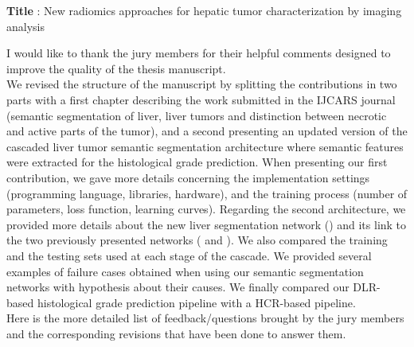 \documentclass{article}
\begin{document}
\textbf{Title} : New radiomics approaches for hepatic tumor characterization by imaging analysis\\

\vspace{0.5cm}

I would like to thank the jury members for their helpful comments designed to improve the quality of the thesis manuscript. \\
We revised the structure of the manuscript by splitting the contributions in two parts with a first chapter describing the work submitted in the IJCARS journal (semantic segmentation of liver, liver tumors and distinction between necrotic and active parts of the tumor), and a second presenting an updated version of the cascaded liver tumor semantic segmentation architecture where semantic features were extracted for the histological grade prediction.
When presenting our first contribution, we gave more details concerning the implementation settings (programming language, libraries, hardware), and the training process (number of parameters, loss function, learning curves).
Regarding the second architecture, we provided more details about the new liver segmentation network () and its link to the two previously presented networks ( and ). We also compared the training and the testing sets used at each stage of the cascade.
We provided several examples of failure cases obtained when using our semantic segmentation networks with hypothesis about their causes.
We finally compared our DLR-based histological grade prediction pipeline with a HCR-based pipeline. \\

Here is the more detailed list of feedback/questions brought by the jury members and the corresponding revisions that have been done to answer them.
\end{document}
